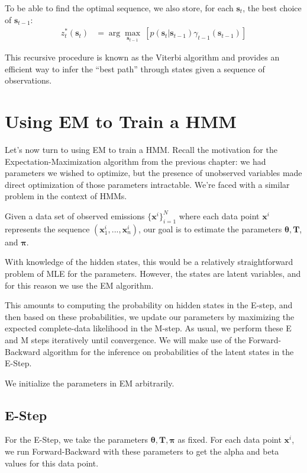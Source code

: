 To be able to find the optimal sequence, we also
 store, for each $\textbf{s}_t$, the best choice of $\textbf{s}_{t-1}$:
\begin{align}
z^*_t(\textbf{s}_t)&=
\arg\max_{\textbf{s}_{t-1}}\ [p(\textbf{s}_t| \textbf{s}_{t-1})\gamma_{t-1}(\textbf{s}_{t-1})]
\end{align}

This recursive procedure is known as the Viterbi algorithm and provides an efficient way to infer the ``best path'' through states given a sequence of observations.


\section{Using EM to Train a HMM}
\label{sec:hmmEM}

Let's now turn to  using EM to train a HMM.
%
Recall the motivation for the Expectation-Maximization algorithm from the previous chapter: we had parameters we wished to optimize, but the presence of unobserved variables made direct optimization of those parameters intractable. We're faced with a similar problem in the context of HMMs.


Given a data set of observed emissions $\{ \textbf{x}^{i} \}_{i=1}^{N}$ where each data point $\textbf{x}^{i}$ represents the sequence $(\textbf{x}_{1}^{i}, ..., \textbf{x}_{n}^{i})$, our goal is to estimate the parameters $\boldsymbol{\theta}, \textbf{T}$, and $\boldsymbol{\pi}$.

With knowledge of the hidden states, this would be a relatively straightforward problem of MLE for the parameters. 
%
However, the states are latent variables, and for this reason we use the EM
algorithm.

This amounts to computing the probability on hidden states in the E-step, and then based on these probabilities, we update our parameters by maximizing the expected complete-data likelihood in the M-step. As usual, we perform these E and M steps iteratively until convergence.  We will make use of the Forward-Backward algorithm for the inference on probabilities of the latent states in the E-Step.

We initialize the parameters in EM arbitrarily. 

\subsection{E-Step}

For the E-Step, we take the parameters $\boldsymbol{\theta}, \textbf{T}, \boldsymbol{\pi}$ as fixed.  For each data point $\mathbf{x}^i$, we run Forward-Backward with these parameters to get the alpha and beta values for this data point.

